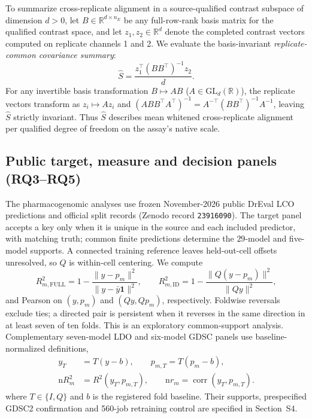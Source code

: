 \documentclass[preprint,12pt,number,sort&compress]{elsarticle}
\newcommand{\R}{\mathbb{R}}
\begin{document}
To summarize cross-replicate alignment in a source-qualified contrast subspace of dimension $d > 0$, let $B \in \R^{d \times n_E}$ be any full-row-rank basis matrix for the qualified contrast space, and let $z_1, z_2 \in \R^d$ denote the completed contrast vectors computed on replicate channels 1 and 2. We evaluate the basis-invariant \emph{replicate-common covariance summary}:
\begin{equation}\label{eq:replicate}
\widehat{S} = \frac{z_1^\top (B B^\top)^{-1} z_2}{d}.
\end{equation}
For any invertible basis transformation $B \mapsto A B$ ($A \in \mathrm{GL}_d(\R)$), the replicate vectors transform as $z_i \mapsto A z_i$ and $(A B B^\top A^\top)^{-1} = A^{-\top}(B B^\top)^{-1}A^{-1}$, leaving $\widehat{S}$ strictly invariant. Thus $\widehat S$ describes mean whitened cross-replicate alignment per qualified degree of freedom on the assay's native scale.

\subsection{Public target, measure and decision panels (RQ3--RQ5)}
The pharmacogenomic analyses use frozen November-2026 public DrEval LCO predictions and official split records (Zenodo record \nolinkurl{23916090}). The target panel accepts a key only when it is unique in the source and each included predictor, with matching truth; common finite predictions determine the $29$-model and five-model supports. A connected training reference leaves held-out-cell offsets unresolved, so $Q$ is within-cell centering. We compute
\begin{equation}\label{eq:publicmetrics}
R^2_{m,\mathrm{FULL}}=1-\frac{\|y-p_m\|^2}{\|y-\bar y\mathbf1\|^2},\qquad
R^2_{m,\mathrm{ID}}=1-\frac{\|Q(y-p_m)\|^2}{\|Qy\|^2},
\end{equation}
and Pearson on $(y,p_m)$ and $(Qy,Qp_m)$, respectively. Foldwise reversals exclude ties; a directed pair is persistent when it reverses in the same direction in at least seven of ten folds. This is an exploratory common-support analysis. Complementary seven-model LDO and six-model GDSC panels use baseline-normalized definitions,
\begin{equation}\label{eq:normalized}
\begin{aligned}
y_T &= T(y - b), \qquad p_{m,T} = T(p_m - b),\\
\mathrm{n}R_m^2 &= R^2(y_T, p_{m,T}), \qquad \mathrm{n}r_m = \operatorname{corr}(y_T, p_{m,T}).
\end{aligned}
\end{equation}
where $T\in\{I,Q\}$ and $b$ is the registered fold baseline. Their supports, prespecified GDSC2 confirmation and 560-job retraining control are specified in Section~S4.
\end{document}
